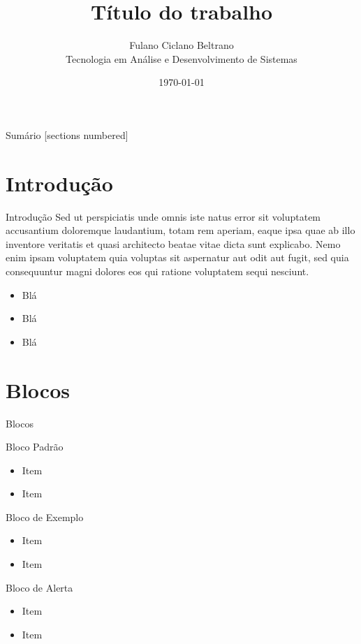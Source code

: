 \documentclass{beamer}
\title{Título do trabalho}
\date{\today}
\author{Fulano Ciclano Beltrano \\ Tecnologia em Análise e Desenvolvimento de Sistemas}
\institute{IFSul - Campus Bagé}
\begin{document}
	
	\begin{frame}[noframenumbering]
		\titlepage
		\thispagestyle{empty}
	\end{frame}
		\begin{frame}{Sumário}
		[sections numbered]
		\tableofcontents[hideallsubsections]
	\end{frame}

\section{Introdução}
\begin{frame}{Introdução}
	Sed ut perspiciatis unde omnis iste natus error sit voluptatem accusantium doloremque laudantium, totam rem aperiam, eaque ipsa quae ab illo inventore veritatis et quasi architecto beatae vitae dicta sunt explicabo. Nemo enim ipsam voluptatem quia voluptas sit aspernatur aut odit aut fugit, sed quia consequuntur magni dolores eos qui ratione voluptatem sequi nesciunt. 
	\begin{itemize}
		\item Blá
		\item Blá
		\item Blá
	\end{itemize}
\end{frame}

\section{Blocos}
\begin{frame}{Blocos}
	\begin{block}{Bloco Padrão}
		\begin{itemize}
			\item Item
			\item Item
		\end{itemize}
	\end{block}	
	\begin{exampleblock}{Bloco de Exemplo}
		\begin{itemize}
			\item Item
			\item Item
		\end{itemize}
	\end{exampleblock}	
	\begin{alertblock}{Bloco de Alerta}
		\begin{itemize}
			\item Item
			\item Item
		\end{itemize}
	\end{alertblock}
\end{frame}
\end{document}
